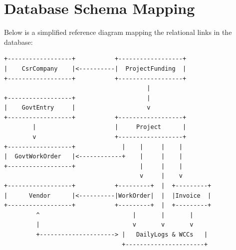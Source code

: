 \documentclass[11pt,a4paper]{article}
\begin{document}
\section{Database Schema Mapping}
Below is a simplified reference diagram mapping the relational links in the database:
\begin{lstlisting}[basicstyle=\ttfamily\footnotesize, frame=single, backgroundcolor=\color{lightgray}]
+------------------+           +------------------+
|    CsrCompany    |<----------|  ProjectFunding  |
+------------------+           +------------------+
                                        |
+------------------+                    |
|    GovtEntry     |                    v
+------------------+           +------------------+
        |                      |     Project      |
        v                      +------------------+
+------------------+             |    |     |    |
|  GovtWorkOrder   |<------------+    |     |    |
+------------------+                  |     |    |
                                      v     |    v
+------------------+           +---------+  |  +---------+
|      Vendor      |<----------|WorkOrder|  |  |Invoice  |
+------------------+           +---------+  |  +---------+
         ^                          |       |       |
         |                          v       v       v
         +---------------------> |   DailyLogs & WCCs   |
                                 +----------------------+
\end{lstlisting}
\end{document}
